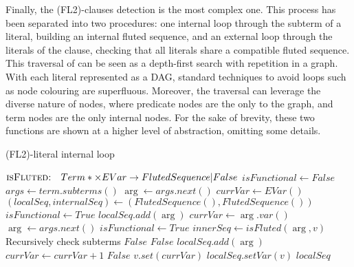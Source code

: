 Finally, the (FL2)-clauses detection is the most complex one. This process has been separated into two procedures: one internal loop through the subterm of a literal, building an internal fluted sequence, and an external loop through the literals of the clause, checking that all literals share a compatible fluted sequence.
This traversal of can be seen as a depth-first search with repetition in a graph. With each literal represented as a DAG, standard techniques to avoid loops such as node colouring are superfluous.
Moreover, the traversal can leverage the diverse nature of nodes, where predicate nodes are the only  to the graph, and term nodes are the only internal nodes.
For the sake of brevity, these two functions are shown at a higher level of abstraction, omitting some details.

\begin{algorithm}[H]
  \caption{(FL2)-literal internal loop}\label{alg:fl2-internal}
  \begin{algorithmic}[1]
      \Statex{}  \(\textsc{isFluted:} \quad Term* \times EVar \to FlutedSequence | False\)
        \State{} \(isFunctional \gets False\)
        \State{} \(args \gets term.subterms()\)
        \State{} \(\arg \gets args.next()\)
        \State{} \(currVar \gets EVar()\)
        \State{} \((localSeq,internalSeq) \gets (FlutedSequence(),FlutedSequence())\)
          \State{} \(isFunctional \gets True\)
          \State{} \(localSeq.add(\arg)\)
        \Else{}
          \State{} \(currVar \gets \arg.var()\)
        \EndIf{}
          \State{} \(\arg \gets args.next()\)
            \State{} \(isFunctional \gets True\)
            \State{} \(innerSeq \gets isFluted(\arg, v)\)
            \Comment{} Recursively check subterms
              \State{} \Return{} \(False\)
            \EndIf{}
              \State{} \Return{} \(False\)
            \EndIf{}
            \State{} \(localSeq.add(\arg)\)
          \Else{}
            \State{} \(currVar \gets currVar +1\)
              \State{} \Return{} \(False\)
            \EndIf{}
          \EndIf{}
        \EndWhile{}
          \State{} \(v.set(currVar)\)
        \EndIf{}
        \State{} \(localSeq.setVar(v)\)
        \State{} \Return{} \(localSeq\)
      \EndFunction{}
  \end{algorithmic}
\end{algorithm}


